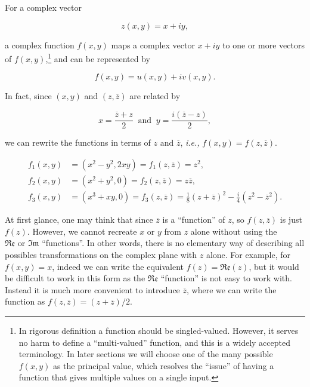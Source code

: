 \documentclass[english,a4paper,12pt]{report}
\begin{document}
For a complex vector 

\begin{equation}
    z(x,y) = x+iy,
\end{equation}

a complex function \(f(x,y)\) maps a complex vector \(x+iy\) to one or more vectors of \(f(x,y)\),\footnote{In rigorous definition a function should be singled-valued. However, it serves no harm to define a ``multi-valued'' function, and this is a widely accepted terminology. In later sections we will choose one of the many possible \(f(x,y)\) as the principal value, which resolves the ``issue'' of having a function that gives multiple values on a single input.}  and can be represented by

\begin{equation}
    f(x,y) = u(x,y) + iv(x,y).
\end{equation}

In fact, since \((x,y)\) and \((z,\overline{z} )\) are related by 

\begin{equation}
    x = \frac{\overline{z} +z }{2} ~\text { and }~ y = \frac{i(\overline{z} -z)}{2},
\end{equation}

we can rewrite the functions in terms of \(z \text { and } \overline{z} \), \textit{i.e.,} \(f(x,y) = f(z, \overline{z} )\). 

\begin{equation}
    \begin{aligned} 
    f_1 (x,y) &= (x^2-y^2,2xy) = f_1 (z,\overline{z} ) = z^2,\\
    f_2 (x,y) &= (x^2+y^2,0) = f_2 (z,\overline{z} ) = z \overline{z} ,\\
    f_3 (x,y) &= (x^3 +xy,0) = f_3 (z,\overline{z} ) = \frac{1}{8} (z + \overline{z} )^2 - \frac{i}{4}(z^2-\overline{z} ^2). 
    \end{aligned} 
\end{equation}

At first glance, one may think that since \(\overline{z} \) is a ``function'' of \(z\), so \(f(z,\overline{z} )\) is just \(f(z)\). However, we cannot recreate \(x \text { or } y\) from \(z\) alone without using the \(\mathfrak{Re} \text { or } \mathfrak{Im}  \) ``functions''. In other words, there is no elementary way of describing all possibles transformations on the complex plane with \(z\) alone. For example, for \(f(x,y) = x\), indeed we can write the equivalent \(f(z) = \mathfrak{Re} (z) \), but it would be difficult to work in this form as the \(\mathfrak{Re} \) ``function'' is not easy to work with. Instead it is much more convenient to introduce \(\overline{z} \), where we can write the function as \(f(z,\overline{z} ) = (z + \overline{z} ) /2\). 
\end{document}
